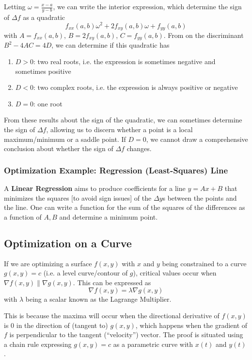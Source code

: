 \documentclass{article}
\begin{document}
Letting $\omega = \frac{x-a}{y-b}$, we can write the interior expression, which determine the sign of $\Delta{f}$ as a quadratic
\[
f_{xx}(a,b)\omega^2+2f_{xy}(a,b)\omega+f_{yy}(a,b)
\] with $A = f_{xx}(a,b)$, $B=2f_{xy}(a,b)$, $C=f_{yy}(a,b)$. From on the discriminant $B^2-4AC=4D$, we can determine if this quadratic has
\begin{enumerate}
    \item $D > 0$: two real roots, i.e. the expression is sometimes negative and sometimes positive
    \item $D < 0$: two complex roots, i.e. the expression is always positive or negative
    \item $D = 0$: one root
\end{enumerate}
From these results about the sign of the quadratic, we can sometimes determine the sign of $\Delta{f}$, allowing us to discern whether a point is a local maximum/minimum or a saddle point. If $D=0$, we cannot draw a comprehensive conclusion about whether the sign of $\Delta{f}$ changes.

\subsubsection{Optimization Example: Regression (Least-Squares) Line} A \textbf{Linear Regression} aims to produce coefficients for a line $y=Ax+B$ that minimizes the squares [to avoid sign issues] of the $\Delta{y}$s between the points and the line. One can write a function for the sum of the squares of the differences as a function of $A,B$ and determine a minimum point.

\subsection{Optimization on a Curve}
If we are optimizing a surface $f(x,y)$ with $x$ and $y$ being constrained to a curve $g(x,y)=c$ (i.e. a level curve/contour of $g$), critical values occur when $\nabla f(x,y) \parallel \nabla g(x,y)$. This can be expressed as
$$\nabla f(x,y) = \lambda\nabla g(x,y)$$ with $\lambda$ being a scalar known as the Lagrange Multiplier.

This is because the maxima will occur when the directional derivative of $f(x,y)$ is $0$ in the direction of (tangent to) $g(x,y)$, which happens when the gradient of $f$ is perpendicular to the tangent (``velocity'') vector. The proof is situated using a chain rule expressing $g(x,y)=c$ as a parametric curve with $x(t)$ and $y(t)$.
\end{document}
